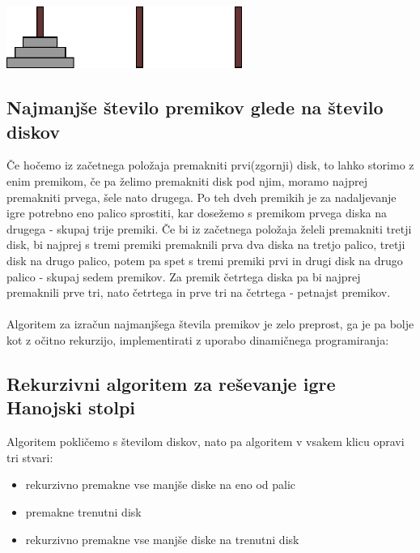 \documentclass[10pt,a4paper,oneside]{book}
\newenvironment{items}{
\begin{itemize}
  \setlength{\itemsep}{1pt}
  \setlength{\parskip}{0pt}
  \setlength{\parsep}{0pt}
}{\end{itemize}}
\begin{document}
\begin{center}
\includegraphics[width=77mm]{towersOfHanoi}
\end{center}

\subsection{Najmanjše število premikov glede na število diskov}
Če hočemo iz začetnega položaja premakniti prvi(zgornji) disk, to lahko storimo z enim premikom, če pa želimo premakniti disk pod njim, moramo najprej premakniti prvega, šele nato drugega. Po teh dveh premikih je za nadaljevanje igre potrebno eno palico sprostiti, kar dosežemo s premikom prvega diska na drugega - skupaj trije premiki. Če bi iz začetnega položaja želeli premakniti tretji disk, bi najprej s tremi premiki premaknili prva dva diska na tretjo palico, tretji disk na drugo palico, potem pa spet s tremi premiki prvi in drugi disk na drugo palico - skupaj sedem premikov. Za premik četrtega diska pa bi najprej premaknili prve tri, nato četrtega in prve tri na četrtega - petnajst premikov.\\
 \\
Algoritem za izračun najmanjšega števila premikov je zelo preprost, ga je pa bolje kot z očitno rekurzijo, implementirati z uporabo dinamičnega programiranja:


\subsection{Rekurzivni algoritem za reševanje igre Hanojski stolpi}
Algoritem pokličemo s številom diskov, nato pa algoritem v vsakem klicu opravi tri stvari:
\begin{items}
	\item rekurzivno premakne vse manjše diske na eno od palic
	\item premakne trenutni disk
	\item rekurzivno premakne vse manjše diske na trenutni disk
\end{items}

\end{document}
